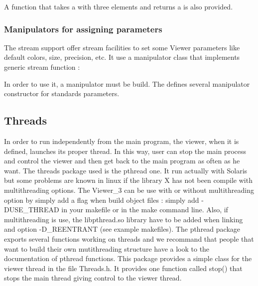 A function that takes a  with three elements and
returns a  is also provided.

\subsubsection{Manipulators for assigning \protect {} parameters}

The stream support offer stream facilities to set some Viewer
parameters like default colors, size, precision, etc. It use a manipulator class  that implements
generic stream function :


In order to use it, a manipulator must be build. The
 defines several manipulator constructor for
standards parameters.

\ccGlue
\ccGlue
\ccGlue
{}
\ccGlue
{}



\subsection{Threads}

In order to run independently from the main program, the viewer, when
it is defined, launches its proper thread. In this way, user can stop
the main process and control the viewer and then get back to the main
program as often as he want. 
The threads package used is the pthread one. It run actually with
Solaris but some problems are known in linux if the library X has not 
been compile with multithreading options. The Viewer\_3 can be use with 
or without multithreading option by simply add a flag when build
object files : simply add -DUSE\_THREAD in your makefile or in the make 
command line. Also, if multithreading is use, the libpthread.so library
have to be added when linking and option -D\_REENTRANT (see example
makefiles).
The pthread package exports several functions working on threads and
we recommand that people that want to build their own mutithreading
structure have a look to the documentation of pthread functions. This
package provides a simple class for the viewer thread in the file
Threads.h. It provides one function called stop() that stops the main
thread giving control to the viewer thread.


